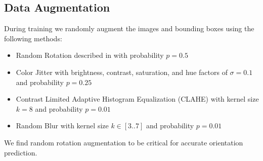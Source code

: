 

\subsection{Data Augmentation}
\label{section:augmentation}
During training we randomly augment the images and bounding boxes using the following methods:

\begin{itemize}
    \item Random Rotation described in \cite{RRPN} with probability $p=0.5$
    \item Color Jitter with brightness, contrast, saturation, and hue factors of $\sigma=0.1$ and probability $p=0.25$ 
    \item Contrast Limited Adaptive Histogram Equalization (CLAHE) \cite{zuiderveld1994contrast} with kernel size $k=8$ and probability $p=0.01$
    \item Random Blur with kernel size $k \in [3..7]$ and probability $p=0.01$
\end{itemize}

We find random rotation augmentation to be critical for accurate orientation prediction.
